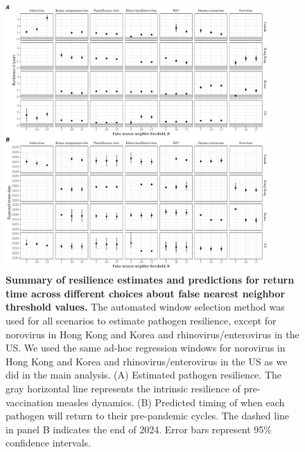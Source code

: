 \documentclass[12pt]{article}
\begin{document}
\pagebreak

\begin{figure}[!th]
\begin{center}
\includegraphics[width=0.9\textwidth]{../figure4_R/figure4_R.pdf}
\caption{
\textbf{Summary of resilience estimates and predictions for return time across different choices about false nearest neighbor threshold values.}
The automated window selection method was used for all scenarios to estimate pathogen resilience, except for norovirus in Hong Kong and Korea and rhinovirus/enterovirus in the US.
We used the same ad-hoc regression windows for norovirus in Hong Kong and Korea and rhinovirus/enterovirus in the US as we did in the main analysis.
(A) Estimated pathogen resilience.
The gray horizontal line represents the intrinsic resilience of pre-vaccination measles dynamics.
(B) Predicted timing of when each pathogen will return to their pre-pandemic cycles.
The dashed line in panel B indicates the end of 2024.
Error bars represent 95\% confidence intervals.
}
\end{center}
\end{figure}

\pagebreak
\end{document}
